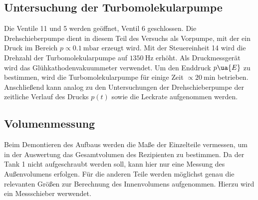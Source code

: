 \subsection{Untersuchung der Turbomolekularpumpe}
Die Ventile 11 und 5 werden geöffnet, Ventil 6 geschlossen. Die Drehschieberpumpe dient in diesem Teil des Versuchs als
Vorpumpe, mit der ein Druck im Bereich $p\propto \SI{0.1}{\milli\bar}$ erzeugt wird. Mit der Steuereinheit 14 wird die Drehzahl der
Turbomolekularpumpe auf $\SI{1350}{\hertz}$ erhöht. Als Druckmessgerät wird das Glühkathodenvakuummeter verwendet. Um den Enddruck $p\ua{E}$
zu bestimmen, wird die Turbomolekularpumpe für einige Zeit $\propto \SI{20}{\minute}$ betrieben. Anschließend kann analog zu den Untersuchungen der
Drehschieberpumpe der zeitliche Verlauf des Drucks $p(t)$ sowie die Leckrate aufgenommen werden.

\subsection{Volumenmessung}
Beim Demontieren des Aufbaus werden die Maße der Einzelteile vermessen, um in der Auswertung das Gesamtvolumen des Rezipienten zu bestimmen. Da der Tank
1 nicht aufgeschraubt werden soll, kann hier nur eine Messung des Außenvolumens erfolgen. Für die anderen Teile werden möglichst genau
die relevanten Größen zur Berechnung des Innenvolumens aufgenommen. Hierzu wird ein Messschieber werwendet.
